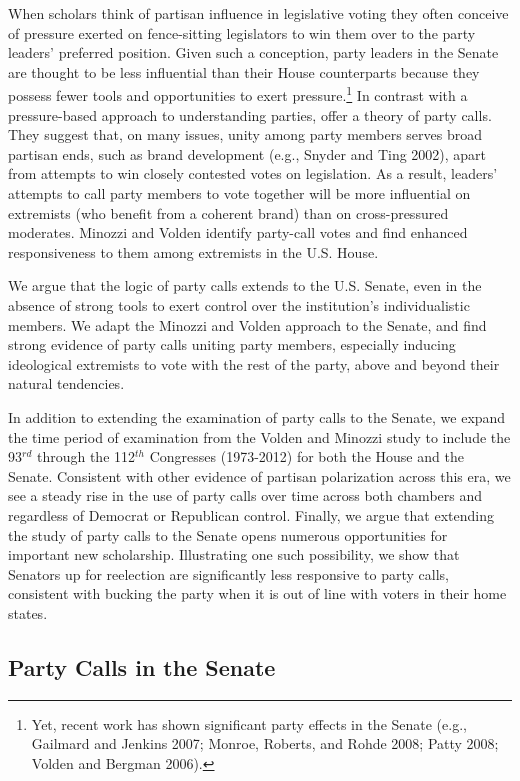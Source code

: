 \documentclass[12pt]{article}
\begin{document}
When scholars think of partisan influence in legislative voting they often conceive of pressure exerted on fence-sitting legislators to win them over to the party leaders' preferred position.  Given such a conception, party leaders in the Senate are thought to be less influential than their House counterparts because they possess fewer tools and opportunities to exert pressure.\footnote{\doublespacing\normalsize Yet, recent work has shown significant party effects in the Senate (e.g., Gailmard and Jenkins 2007; Monroe, Roberts, and Rohde 2008; Patty 2008; Volden and Bergman 2006).} In contrast with a pressure-based approach to understanding parties, \cite{Minozzi:2013} offer a theory of party calls. They suggest that, on many issues, unity among party members serves broad partisan ends, such as brand development (e.g., Snyder and Ting 2002), apart from attempts to win closely contested votes on legislation. As a result, leaders' attempts to call party members to vote together will be more influential on extremists (who benefit from a coherent brand) than on cross-pressured moderates. Minozzi and Volden identify party-call votes and find enhanced responsiveness to them among extremists in the U.S. House.

We argue that the logic of party calls extends to the U.S. Senate, even in the absence of strong tools to exert control over the institution's individualistic members. We adapt the Minozzi and Volden approach to the Senate, and find strong evidence of party calls uniting party members, especially inducing ideological extremists to vote with the rest of the party, above and beyond their natural tendencies.

In addition to extending the examination of party calls to the Senate, we expand the time period of examination from the Volden and Minozzi study to include the 93$^{rd}$ through the 112$^{th}$ Congresses (1973-2012) for both the House and the Senate. Consistent with other evidence of partisan polarization across this era, we see a steady rise in the use of party calls over time across both chambers and regardless of Democrat or Republican control. Finally, we argue that extending the study of party calls to the Senate opens numerous opportunities for important new scholarship. Illustrating one such possibility, we show that Senators up for reelection are significantly less responsive to party calls, consistent with bucking the party when it is out of line with voters in their home states.

\subsection*{Party Calls in the Senate}
\end{document}
